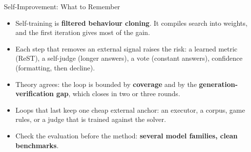 \begin{frame}{Self-Improvement: What to Remember}
    \begin{itemize}\itemsep0.4em
        \item Self-training is \textbf{filtered behaviour cloning}. It compiles search into weights, and the first iteration gives most of the gain.
        \item Each step that removes an external signal raises the risk: a learned metric (ReST), a self-judge (longer answers), a vote (constant answers), confidence (formatting, then decline).
        \item Theory agrees: the loop is bounded by \textbf{coverage} and by the \textbf{generation-verification gap}, which closes in two or three rounds.
        \item Loops that last keep one cheap external anchor: an executor, a corpus, game rules, or a judge that is trained against the solver.
        \item Check the evaluation before the method: \textbf{several model families, clean benchmarks}.
    \end{itemize}
    \vspace{0.3em}
\end{frame}
